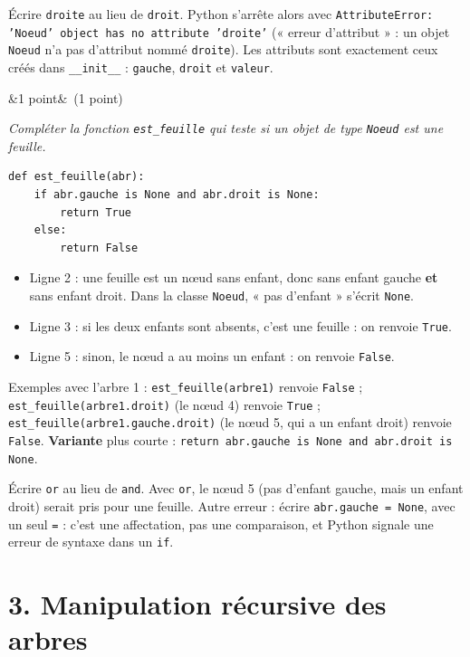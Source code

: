\documentclass[11pt, a4paper]{exam}
\newcommand{\code}[1]{\texttt{#1}}
\newcommand{\Q}[3]{\par\needspace{5\baselineskip}\bigskip\noindent{\large\bfseries Question #1}\ifx&#2&\else\ \textnormal{(#2)}\fi\par\nopagebreak\smallskip\noindent\textit{#3}\par\nopagebreak\smallskip}
\begin{document}
\begin{erreur}
Écrire \code{droite} au lieu de \code{droit}. Python s'arrête alors avec \code{AttributeError: 'Noeud' object has no attribute 'droite'} (« erreur d'attribut » : un objet \code{Noeud} n'a pas d'attribut nommé \code{droite}). Les attributs sont exactement ceux créés dans \code{\_\_init\_\_} : \code{gauche}, \code{droit} et \code{valeur}.
\end{erreur}

\Q{6}{1 point}{Compléter la fonction \code{est\_feuille} qui teste si un objet de type \code{Noeud} est une feuille.}
\begin{reponse}
\begin{lstlisting}
def est_feuille(abr):
    if abr.gauche is None and abr.droit is None:
        return True
    else:
        return False
\end{lstlisting}
\end{reponse}
\begin{itemize}
\item Ligne 2 : une feuille est un nœud sans enfant, donc sans enfant gauche \textbf{et} sans enfant droit. Dans la classe \code{Noeud}, « pas d'enfant » s'écrit \code{None}.
\item Ligne 3 : si les deux enfants sont absents, c'est une feuille : on renvoie \code{True}.
\item Ligne 5 : sinon, le nœud a au moins un enfant : on renvoie \code{False}.
\end{itemize}
Exemples avec l'arbre 1 : \code{est\_feuille(arbre1)} renvoie \code{False} ; \code{est\_feuille(arbre1.droit)} (le nœud 4) renvoie \code{True} ; \code{est\_feuille(arbre1.gauche.droit)} (le nœud 5, qui a un enfant droit) renvoie \code{False}.
\textbf{Variante} plus courte : \code{return abr.gauche is None and abr.droit is None}.
\begin{erreur}
Écrire \code{or} au lieu de \code{and}. Avec \code{or}, le nœud 5 (pas d'enfant gauche, mais un enfant droit) serait pris pour une feuille. Autre erreur : écrire \code{abr.gauche = None}, avec un seul \code{=} : c'est une affectation, pas une comparaison, et Python signale une erreur de syntaxe dans un \code{if}.
\end{erreur}

\section*{3. Manipulation récursive des arbres}
\end{document}
